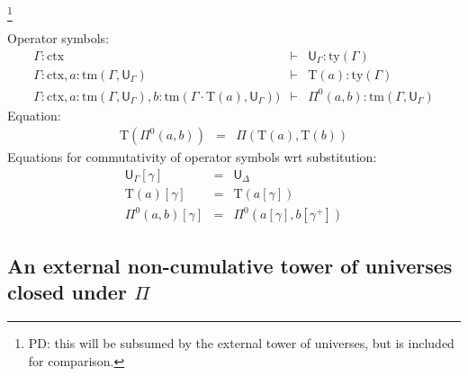 \documentclass[11pt,a4paper]{article}
\theoremstyle{definition}
\newcommand{\N}{\mathsf{N}}
\newcommand{\ctx}{\mathrm{ctx}}
\newcommand{\ty}{\mathrm{ty}}
\newcommand{\tm}{\mathrm{tm}}
\newcommand{\tuple}[1]{\langle #1 \rangle}
\def\p{\mathrm{p}}
\def\q{\mathrm{q}}
\def\U{\mathsf{U}}
\newcommand{\Ta}{\mathrm{T}}
\begin{document}
\footnote{PD: this will be subsumed by the external tower of universes, but is included for comparison.}
\begin{tiny}
Operator symbols:
\begin{eqnarray*}
\Gamma : \ctx &\vdash& \U_\Gamma : \ty(\Gamma)\\
\Gamma : \ctx, a : \tm(\Gamma,\U_\Gamma) &\vdash& {\Ta}(a) : \ty(\Gamma)\\
\Gamma : \ctx,
a : \tm(\Gamma,\U_\Gamma),
b :  \tm(\Gamma \cdot \Ta(a), \U_\Gamma))
&\vdash&
 \Pi^0(a,b) : \tm(\Gamma,\U_\Gamma)
\end{eqnarray*}
Equation:
\begin{eqnarray*}
\Ta(\Pi^0(a,b)) &=& \Pi(\Ta(a),\Ta(b))
\end{eqnarray*}
 Equations for commutativity of operator symbols wrt substitution:
 \begin{eqnarray*}
{\U}_\Gamma [ \gamma ] &=& {\U}_\Delta\\
\Ta(a) [ \gamma ] &=& \Ta(a[ \gamma ] )\\
\Pi^0(a,b)[ \gamma ] &=& \Pi^0(a [ \gamma ], b[ \gamma^+ ])
\end{eqnarray*}
\end{tiny}

\subsection{An external non-cumulative tower of universes closed under $\Pi$}
\end{document}
